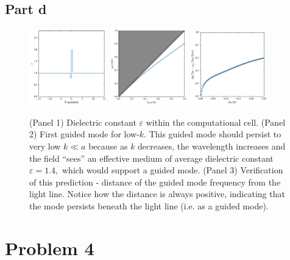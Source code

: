 \documentclass[aps,letterpaper,10pt]{article}
\begin{document}
\subsection{Part d}
\begin{figure}[!h]
\centering
\includegraphics[width=0.3\textwidth]{3d-1}
\includegraphics[width=0.3\textwidth]{3d-2}
\includegraphics[width=0.3\textwidth]{3d-3}
\caption{\label{fig:3d} (Panel 1) Dielectric constant $\varepsilon$ within the computational cell. (Panel 2) First guided mode for low-$k$. This guided mode should persist to very low $k\ll a$ because as $k$ decreases, the wavelength increases and the field ``sees'' an effective medium of average dielectric constant $\varepsilon=1.4,$ which would support a guided mode. (Panel 3) Verification of this prediction - distance of the guided mode frequency from the light line. Notice how the distance is always positive, indicating that the mode persists beneath the light line (i.e. as a guided mode).}
\end{figure}

\newpage
\section{Problem 4}
\end{document}
